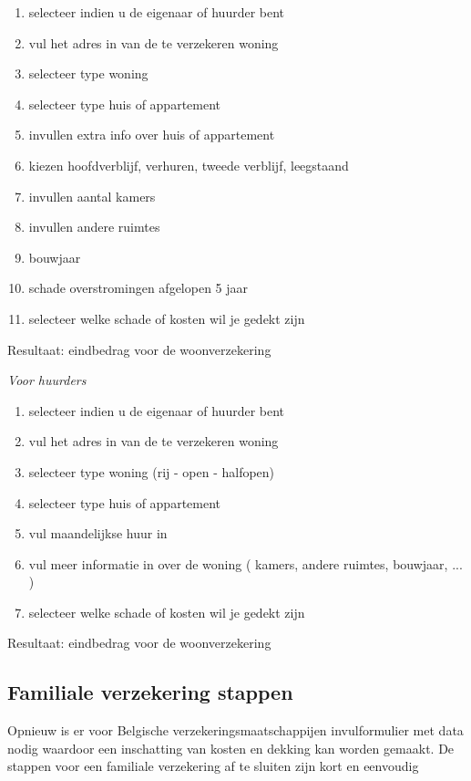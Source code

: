 \begin{enumerate}[label=Stap \arabic*:]
	\item selecteer indien u de eigenaar of huurder bent
	\item vul het adres in van de te verzekeren woning
	\item selecteer type woning
	\item selecteer type huis of appartement
	\item invullen extra info over huis of appartement
	\item kiezen hoofdverblijf, verhuren, tweede verblijf, leegstaand
	\item invullen aantal kamers
	\item invullen andere ruimtes
	\item bouwjaar
	\item schade overstromingen afgelopen 5 jaar
	\item selecteer welke schade of kosten wil je gedekt zijn
\end{enumerate}      
Resultaat: eindbedrag voor de woonverzekering

\emph{Voor huurders}

\begin{enumerate}[label=Stap \arabic*:]
	\item selecteer indien u de eigenaar of huurder bent
	\item vul het adres in van de te verzekeren woning
	\item selecteer type woning (rij - open - halfopen)
	\item selecteer type huis of appartement
	\item vul maandelijkse huur in
	\item vul meer informatie in over de woning ( kamers, andere ruimtes, bouwjaar, ... )
	\item selecteer welke schade of kosten wil je gedekt zijn
\end{enumerate}
Resultaat: eindbedrag voor de woonverzekering



\subsection{Familiale verzekering stappen}
Opnieuw is er voor Belgische verzekeringsmaatschappijen invulformulier met data nodig waardoor een inschatting van kosten en dekking kan worden gemaakt.
De stappen voor een familiale verzekering af te sluiten zijn kort en eenvoudig

